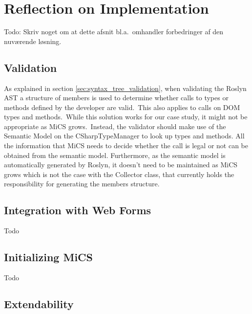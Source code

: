 \section{Reflection on Implementation} %
\label{sec:reflection_on_implementation}
Todo: Skriv noget om at dette afsnit bl.a.\ omhandler forbedringer af den nuværende løsning.

\subsection{Validation} %
\label{ssub:validation}

As explained in section \ref{sec:syntax_tree_validation}, when validating the Roslyn AST a structure of members is used to determine whether calls to types or methods defined by the developer are valid.\ This also applies to calls on DOM types and methods.\ While this solution works for our case study, it might not be appropriate as MiCS grows.\ Instead, the validator should make use of the Semantic Model on the CSharpTypeManager to look up types and methods. All the information that MiCS needs to decide whether the call is legal or not can be obtained from the semantic model. Furthermore, as the semantic model is automatically generated by Roslyn, it doesn't need to be maintained as MiCS grows which is not the case with the Collector class, that currently holds the responsibility for generating the members structure.

\subsection{Integration with Web Forms} %
\label{ssub:integration_with_web_forms}
Todo

\subsection{Initializing MiCS} %
\label{ssub:collecting_source_code}
Todo

\subsection{Extendability} %
\label{sub:extendability}


